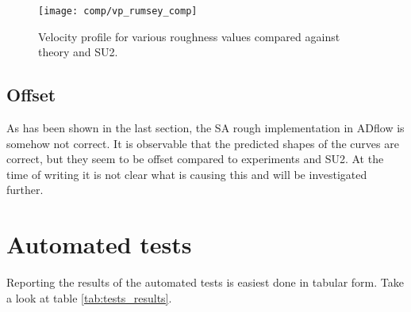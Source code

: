 \begin{figure}[H] \centering
  \texttt{[image: comp/vp\_rumsey\_comp]}
    \caption{Velocity profile for various roughness values compared
      against theory and SU2.}
    \label{fig:vp_rumsey_comp}
\end{figure}

\subsection{Offset}
As has been shown in the last section, the SA rough implementation in ADflow is
somehow not correct. It is observable that the predicted shapes of the curves are
correct, but they seem to be offset compared to experiments and SU2. At the time
of writing it is not clear what is causing this and will be investigated
further.

\section{Automated tests} Reporting the results of the automated tests is
easiest done in tabular form. Take a look at table \ref{tab:tests_results}.


